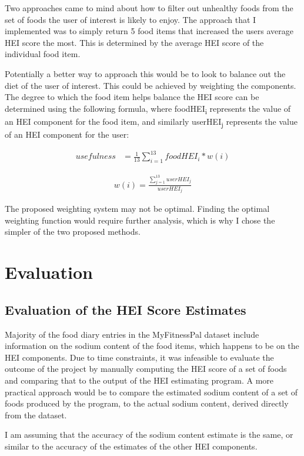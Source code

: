 \documentclass{article}
\begin{document}
\bigskip
\noindent Two approaches came to mind about how to filter out unhealthy foods from the set of foods the user of interest is likely to enjoy. The approach that I implemented was to simply return 5 food items that increased the users average HEI score the most. This is determined by the average HEI score of the individual food item.

\bigskip
\noindent Potentially a better way to approach this would be to look to balance out the diet of the user of interest. This could be achieved by weighting the components. The degree to which the food item helps balance the HEI score can be determined using the following formula, where foodHEI\textsubscript{i} represents the value of an HEI component for the food item, and similarly userHEI\textsubscript{j} represents the value of an HEI component for the user: 

\begin{align*}
    usefulness &= \frac{1}{13} \sum_{i=1}^{13} foodHEI_{i} * w(i)
\end{align*}

\begin{align*}
    w(i) = \frac{\sum_{j=1}^{13} userHEI_{j}}{userHEI_{j}}
\end{align*}

\bigskip
\noindent The proposed weighting system may not be optimal. Finding the optimal weighting function would require further analysis, which is why I chose the simpler of the two proposed methods.

\section{Evaluation}
\subsection{Evaluation of the HEI Score Estimates}
Majority of the food diary entries in the MyFitnessPal dataset \cite{diet_success_predictions} include information on the sodium content of the food items, which happens to be on the HEI components. Due to time constraints, it was infeasible to evaluate the outcome of the project by manually computing the HEI score of a set of foods and comparing that to the output of the HEI estimating program. A more practical approach would be to compare the estimated sodium content of a set of foods produced by the program, to the actual sodium content, derived directly from the dataset. 

\bigskip 
\noindent I am assuming that the accuracy of the sodium content estimate is the same, or similar to the accuracy of the estimates of the other HEI components.
\end{document}
